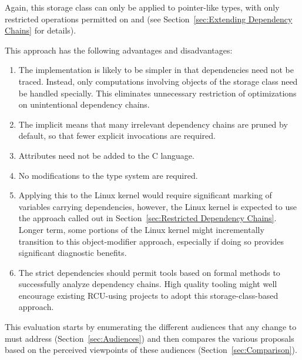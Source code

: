\documentclass[letterpaper,twocolumn,10pt]{article}
\begin{document}
Again, this  storage class can only be
applied to pointer-like types, with only restricted operations
permitted on  and 
(see Section~\ref{sec:Extending Dependency Chains} for details).

This approach has the following advantages and disadvantages:

\begin{enumerate}
\item	The implementation is likely to be simpler in that dependencies
	need not be traced.
	Instead, only computations involving objects of the
	 storage class need be handled specially.
	This eliminates unnecessary restriction of optimizations on
	unintentional dependency chains.
\item	The implicit  means that many
	irrelevant dependency chains are pruned by default, so
	that fewer explicit  invocations
	are required.
\item	Attributes need not be added to the C language.
\item	No modifications to the type system are required.
\item	Applying this to the Linux kernel would require significant
	marking of variables carrying dependencies, however,
	the Linux kernel is expected to use the approach called out in
	Section~\ref{sec:Restricted Dependency Chains}.
	Longer term, some portions of the Linux kernel might incrementally
	transition to this object-modifier approach, especially if doing
	so provides significant diagnostic benefits.
\item	The strict dependencies should permit tools based on formal
	methods to successfully analyze dependency chains.
	High quality tooling might well encourage existing RCU-using
	projects to adopt this storage-class-based approach.
\end{enumerate}


This evaluation starts by enumerating the different audiences that any
change to  must address
(Section~\ref{sec:Audiences})
and then compares the various proposals based on the perceived viewpoints
of these audiences
(Section~\ref{sec:Comparison}).
\end{document}
